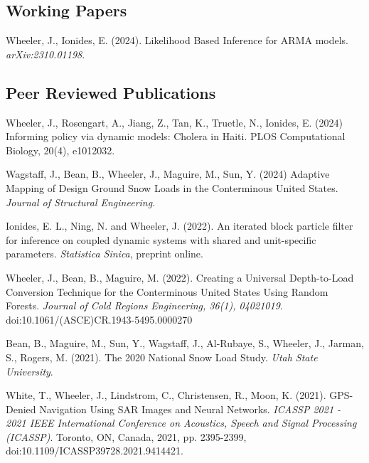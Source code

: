 \documentclass[11pt] {article}
\newenvironment {reflist}
                {
                 \begin{list}{}
                 {\setlength{\labelwidth}{0mm}
                  \setlength{\leftmargin}{8mm}
                  \setlength{\itemindent}{-3mm}
                  \setlength{\labelsep}{0mm}
                  \setlength{\parsep}{0.1 ex}
                  \setlength{\itemsep}{0.1cm}
      \setlength{\topsep}{0.15cm}}} %
   {\end{list}}
\begin{document}
\subsection*{Working Papers}

\begin{reflist}

    \item Wheeler, J., Ionides, E. (2024). Likelihood Based Inference for ARMA models. {\it arXiv:2310.01198}.


\end{reflist}

\subsection*{Peer Reviewed Publications}

\begin{reflist}

    \item Wheeler, J., Rosengart, A., Jiang, Z., Tan, K., Truetle, N., Ionides, E. (2024) Informing policy via dynamic models: Cholera in Haiti. {PLOS Computational Biology}, 20(4), e1012032.

    \item Wagstaff, J., Bean, B., Wheeler, J., Maguire, M., Sun, Y. (2024) Adaptive Mapping of Design Ground Snow Loads in the Conterminous United States. {\it Journal of Structural Engineering}.

    \item Ionides, E. L., Ning, N. and Wheeler, J. (2022). An iterated block particle filter for inference on coupled dynamic systems with shared and unit-specific parameters. {\it Statistica Sinica}, preprint online.

    \item Wheeler, J., Bean, B., Maguire, M. (2022). Creating a Universal Depth-to-Load Conversion Technique for the Conterminous United States Using Random Forests. {\it Journal of Cold Regions Engineering, 36(1), 04021019}. doi:10.1061/(ASCE)CR.1943-5495.0000270

    \item Bean, B., Maguire, M., Sun, Y., Wagstaff, J., Al-Rubaye, S., Wheeler, J., Jarman, S., Rogers, M. (2021). The 2020 National Snow Load Study. {\it Utah State University}.

    \item White, T., Wheeler, J., Lindstrom, C., Christensen, R., Moon, K. (2021). GPS-Denied Navigation Using SAR Images and Neural Networks. {\it ICASSP 2021 - 2021 IEEE International Conference on Acoustics, Speech and Signal Processing (ICASSP)}. Toronto, ON, Canada, 2021, pp. 2395-2399, doi:10.1109/ICASSP39728.2021.9414421.

\end{reflist}
\end{document}
